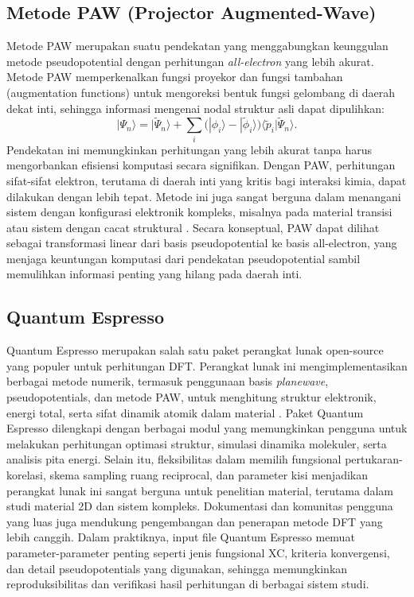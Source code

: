 \subsection{Metode PAW (Projector Augmented-Wave)}
Metode PAW merupakan suatu pendekatan yang menggabungkan keunggulan metode pseudopotential dengan perhitungan \emph{all-electron} yang lebih akurat.
Metode PAW memperkenalkan fungsi proyekor dan fungsi tambahan (augmentation functions) untuk mengoreksi bentuk fungsi gelombang di daerah dekat inti, sehingga informasi mengenai nodal struktur asli dapat dipulihkan:
\begin{equation}
|\Psi_n\rangle = |\tilde{\Psi}_n\rangle + \sum_i \Big(|\phi_i\rangle - |\tilde{\phi}_i\rangle\Big) \langle \tilde{p}_i |
\tilde{\Psi}_n \rangle.
\end{equation}
Pendekatan ini memungkinkan perhitungan yang lebih akurat tanpa harus mengorbankan efisiensi komputasi secara signifikan.
Dengan PAW, perhitungan sifat-sifat elektron, terutama di daerah inti yang kritis bagi interaksi kimia, dapat dilakukan dengan lebih tepat.
Metode ini juga sangat berguna dalam menangani sistem dengan konfigurasi elektronik kompleks, misalnya pada material transisi atau sistem dengan cacat struktural \cite{Blochl1994}.
Secara konseptual, PAW dapat dilihat sebagai transformasi linear dari basis pseudopotential ke basis all-electron, yang menjaga keuntungan komputasi dari pendekatan pseudopotential sambil memulihkan informasi penting yang hilang pada daerah inti.

\subsection{Quantum Espresso}
Quantum Espresso merupakan salah satu paket perangkat lunak open-source yang populer untuk perhitungan DFT.
Perangkat lunak ini mengimplementasikan berbagai metode numerik, termasuk penggunaan basis \emph{planewave}, pseudopotentials, dan metode PAW, untuk menghitung struktur elektronik, energi total, serta sifat dinamik atomik dalam material \cite{Giannozzi2009}.
Paket Quantum Espresso dilengkapi dengan berbagai modul yang memungkinkan pengguna untuk melakukan perhitungan optimasi struktur, simulasi dinamika molekuler, serta analisis pita energi.
Selain itu, fleksibilitas dalam memilih fungsional pertukaran-korelasi, skema sampling ruang reciprocal, dan parameter kisi menjadikan perangkat lunak ini sangat berguna untuk penelitian material, terutama dalam studi material 2D dan sistem kompleks.
Dokumentasi dan komunitas pengguna yang luas juga mendukung pengembangan dan penerapan metode DFT yang lebih canggih.
Dalam praktiknya, input file Quantum Espresso memuat parameter-parameter penting seperti jenis fungsional XC, kriteria konvergensi, dan detail pseudopotentials yang digunakan, sehingga memungkinkan reproduksibilitas dan verifikasi hasil perhitungan di berbagai sistem studi.

